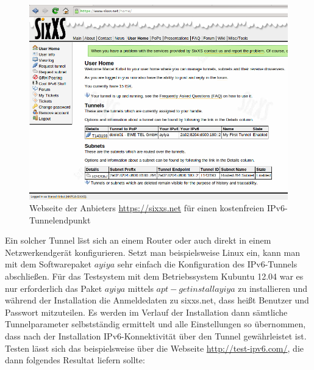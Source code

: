 \documentclass[a4paper,12pt]{scrartcl}
\begin{document}
\begin{figure}[htb]
\begin{center}
 \includegraphics[width=1\hsize]{./images/sixxs.png}
 \end{center}
\caption[Webseite der Anbieters \url{https://sixxs.net} f\"ur einen kostenfreien IPv6-Tunnelendpunkt]{\label{sixxs}Webseite der Anbieters \url{https://sixxs.net} f\"ur einen kostenfreien IPv6-Tunnelendpunkt}
\end{figure}

Ein solcher Tunnel l\"sst sich an einem Router oder auch direkt in einem Netzwerkendger\"at konfigurieren. Setzt man beispielsweise Linux ein, kann man mit dem Softwarepaket $ayiya$ sehr einfach die Konfiguration des IPv6-Tunnels abschlie{\ss}en. F\"ur das Testsystem mit dem Betriebssystem Kubuntu 12.04 war es nur erforderlich das Paket $ayiya$ mittels $apt-get install ayiya$ zu installieren und w\"ahrend der Installation die Anmeldedaten zu sixxs.net, dass hei{\ss}t Benutzer und Passwort mitzuteilen. Es werden im Verlauf der Installation dann s\"amtliche Tunnelparameter selbstst\"andig ermittelt und alle Einstellungen so \"ubernommen, dass nach der Installation IPv6-Konnektivität \"uber den Tunnel gew\"ahrleistet ist. Testen l\"asst sich das beispielsweise \"uber die Webseite \url{http://test-ipv6.com/}, die dann folgendes Resultat liefern sollte:
\end{document}
